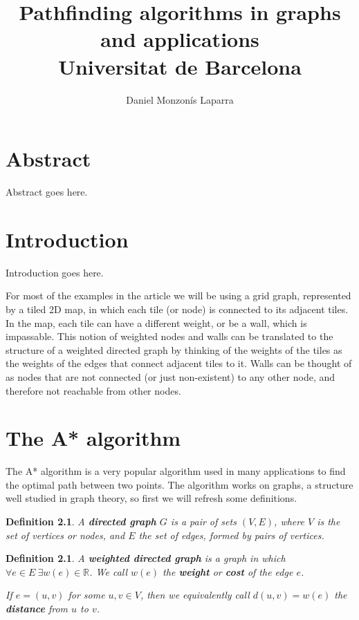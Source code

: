 \documentclass[12pt]{report}
\title{
{Pathfinding algorithms in graphs and applications}\\
{\large Universitat de Barcelona}
}
\author{Daniel Monzonís Laparra}
\newtheorem{definition}[theorem]{Definition}
\begin{document}
\maketitle

\chapter*{Abstract}
Abstract goes here.

\tableofcontents

\chapter{Introduction}
Introduction goes here.

For most of the examples in the article we will be using a grid graph, represented by a tiled 2D map, in which each tile (or node) is connected to its adjacent tiles. In the map, each tile can have a different weight, or be a wall, which is impassable. This notion of weighted nodes and walls can be translated to the structure of a weighted directed graph by thinking of the weights of the tiles as the weights of the edges that connect adjacent tiles to it. Walls can be thought of as nodes that are not connected (or just non-existent) to any other node, and therefore not reachable from other nodes.

\chapter{The A* algorithm}
The A* algorithm is a very popular algorithm used in many applications to find the optimal path between two points. The algorithm works on graphs, a structure well studied in graph theory, so first we will refresh some definitions.

\begin{definition}
A \textbf{directed graph} $G$ is a pair of sets $(V, E)$, where $V$ is the set of vertices or nodes, and $E$ the set of edges, formed by pairs of vertices.
\end{definition}

\begin{definition}
A \textbf{weighted directed graph} is a graph in which $\forall e \in E \ \exists w(e) \in \mathbb{R}$. We call $w(e)$ the \textbf{weight} or \textbf{cost} of the edge $e$.

If $e = (u, v)$ for some $u, v \in V$, then we equivalently call $d(u, v) = w(e)$ the \textbf{distance} from $u$ to $v$.
\end{definition}
\end{document}
